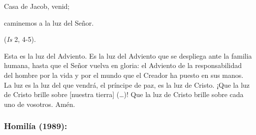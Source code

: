 \begin{body}
	Casa de Jacob, venid; 
	
	caminemos a la luz del Señor. 
	
	(\emph{Is} 2, 4-5). 
	
	Esta es la luz del Adviento. Es la luz del Adviento que se despliega ante la familia humana, hasta que el Señor vuelva en gloria: el Adviento de la responsabilidad del hombre por la vida y por el mundo que el Creador ha puesto en sus manos. La luz es la luz del que vendrá, el príncipe de paz, es la luz de Cristo. ¡Que la luz de Cristo brille sobre {[}nuestra tierra{]} (\ldots{})! Que la luz de Cristo brille sobre cada uno de vosotros. Amén. 
\end{body} 

\subsubsection{Homilía (1989):}


